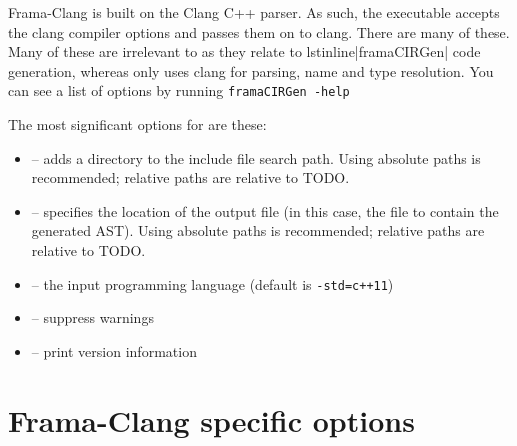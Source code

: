 Frama-Clang is built on the Clang C++ parser. 
As such, the \irg executable accepts the clang
compiler options and passes them on to clang. There are many of these.
Many of these are irrelevant to \fcl as they relate to lstinline|framaCIRGen|
code generation, whereas \fcl only uses clang for parsing, name
and type resolution.
You can see a list of options by running 
\lstinline|framaCIRGen -help|

The most significant options for  \irg are these:
\begin{itemize}
	\item {} -- adds a directory to the include file search path. Using absolute paths is recommended; relative paths are relative to TODO.
	\item {} -- specifies the location of the output file (in this case, the file to contain the generated AST). Using absolute paths is recommended; relative paths are relative to TODO.
	\item {} -- the input programming language (default is \lstinline|-std=c++11|)
	\item {} -- suppress warnings
	\item {} -- print version information
\end{itemize}

\section{Frama-Clang specific options}

